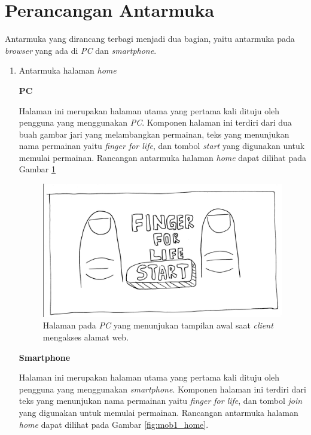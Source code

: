 \section{Perancangan Antarmuka}
\label{sec:antarmuka}

Antarmuka yang dirancang terbagi menjadi dua bagian, yaitu antarmuka pada \textit{browser} yang ada di \textit{PC} dan \textit{smartphone}.

\begin{enumerate}
	\item Antarmuka halaman \textit{home}
	
	\textbf{PC}
	
	Halaman ini merupakan halaman utama yang pertama kali dituju oleh pengguna yang menggunakan \textit{PC}. Komponen halaman ini terdiri dari dua buah gambar jari yang melambangkan permainan, teks yang menunjukan nama permainan yaitu \textit{finger for life}, dan tombol \textit{start} yang digunakan untuk memulai permainan. Rancangan antarmuka halaman \textit{home} dapat dilihat pada Gambar \ref{fig:web1_home}

\begin{figure}[H]
	\centering
	\includegraphics[scale=0.1]{Gambar/web1_home}
	\caption{Halaman pada \textit{PC} yang menunjukan tampilan awal saat \textit{client} mengakses alamat web.}
	\label{fig:web1_home}
\end{figure}

	\textbf{Smartphone}
	
	Halaman ini merupakan halaman utama yang pertama kali dituju oleh pengguna yang menggunakan \textit{smartphone}. Komponen halaman ini terdiri dari teks yang menunjukan nama permainan yaitu \textit{finger for life}, dan tombol \textit{join} yang digunakan untuk memulai permainan. Rancangan antarmuka halaman \textit{home} dapat dilihat pada Gambar \ref{fig:mob1_home}.
	

\end{enumerate}
